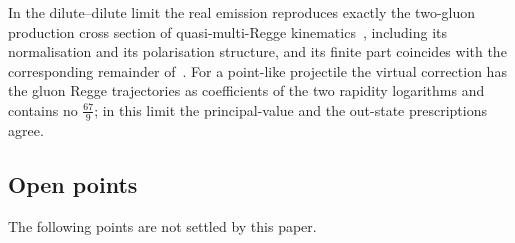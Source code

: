 In the dilute--dilute limit the real emission reproduces exactly the two-gluon production cross section of quasi-multi-Regge kinematics~\cite{Fadin:1998py,Bartels:2006hg}, including its normalisation and its polarisation structure, and its finite part coincides with the corresponding remainder of~\cite{Bartels:2006hg}. For a point-like projectile the virtual correction has the gluon Regge trajectories as coefficients of the two rapidity logarithms and contains no $\frac{67}{9}$; in this limit the principal-value and the out-state prescriptions agree.

\subsection{Open points}\label{sec:openpoints}

The following points are not settled by this paper.
